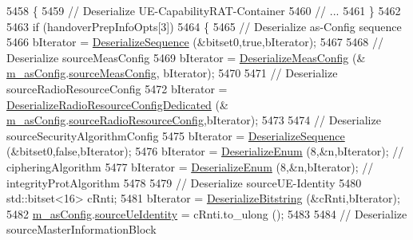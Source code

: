 \begin{DoxyCode}
5458             \{
5459               \textcolor{comment}{// Deserialize UE-CapabilityRAT-Container}
5460               \textcolor{comment}{// ...}
5461             \}
5462 
5463           \textcolor{keywordflow}{if} (handoverPrepInfoOpts[3])
5464             \{
5465               \textcolor{comment}{// Deserialize as-Config sequence}
5466               bIterator = \hyperlink{classns3_1_1Asn1Header_a58c68bb97ba3fe2e8fcdd7c208d672b2}{DeserializeSequence} (&bitset0,\textcolor{keyword}{true},bIterator);
5467 
5468               \textcolor{comment}{// Deserialize sourceMeasConfig}
5469               bIterator = \hyperlink{classns3_1_1RrcAsn1Header_a2bad164e0412e09c0f68aeaee202ee35}{DeserializeMeasConfig} (&
      \hyperlink{classns3_1_1HandoverPreparationInfoHeader_adfafc689e36800c0c59d495f74e3bdc1}{m\_asConfig}.\hyperlink{structns3_1_1LteRrcSap_1_1AsConfig_a2ce82c6247fc2469637bd9b31104dcf5}{sourceMeasConfig}, bIterator);
5470 
5471               \textcolor{comment}{// Deserialize sourceRadioResourceConfig}
5472               bIterator = \hyperlink{classns3_1_1RrcAsn1Header_abafc8885597eb46dfaea4bc5a715b00d}{DeserializeRadioResourceConfigDedicated} (&
      \hyperlink{classns3_1_1HandoverPreparationInfoHeader_adfafc689e36800c0c59d495f74e3bdc1}{m\_asConfig}.\hyperlink{structns3_1_1LteRrcSap_1_1AsConfig_a09d460adcf96fabdd6f3c493f36bf876}{sourceRadioResourceConfig},bIterator);
5473 
5474               \textcolor{comment}{// Deserialize sourceSecurityAlgorithmConfig}
5475               bIterator = \hyperlink{classns3_1_1Asn1Header_a58c68bb97ba3fe2e8fcdd7c208d672b2}{DeserializeSequence} (&bitset0,\textcolor{keyword}{false},bIterator);
5476               bIterator = \hyperlink{classns3_1_1Asn1Header_a4fcc253e0eec3483c775b005c1875f2d}{DeserializeEnum} (8,&n,bIterator); \textcolor{comment}{// cipheringAlgorithm}
5477               bIterator = \hyperlink{classns3_1_1Asn1Header_a4fcc253e0eec3483c775b005c1875f2d}{DeserializeEnum} (8,&n,bIterator); \textcolor{comment}{// integrityProtAlgorithm}
5478 
5479               \textcolor{comment}{// Deserialize sourceUE-Identity}
5480               std::bitset<16> cRnti;
5481               bIterator = \hyperlink{classns3_1_1Asn1Header_adb34498b05e8562fba5d40f49578968d}{DeserializeBitstring} (&cRnti,bIterator);
5482               \hyperlink{classns3_1_1HandoverPreparationInfoHeader_adfafc689e36800c0c59d495f74e3bdc1}{m\_asConfig}.\hyperlink{structns3_1_1LteRrcSap_1_1AsConfig_a29f8fddb659f258d7250a35282cc85ca}{sourceUeIdentity} = cRnti.to\_ulong ();
5483 
5484               \textcolor{comment}{// Deserialize sourceMasterInformationBlock}

\end{DoxyCode}
